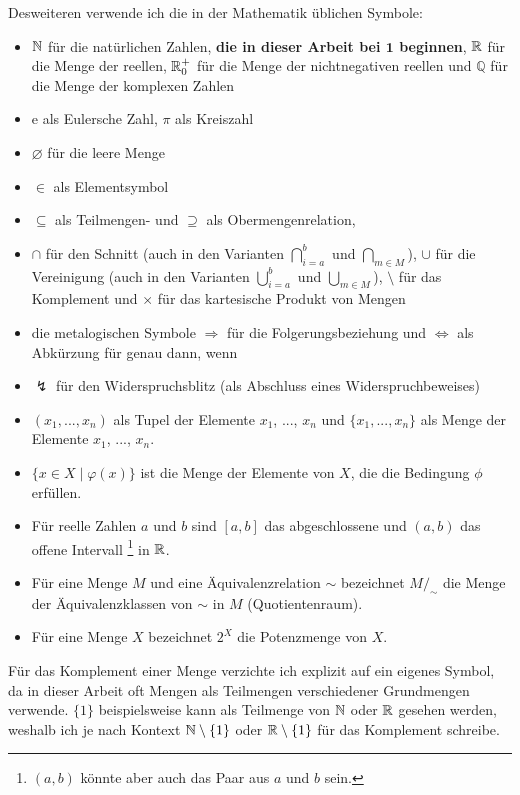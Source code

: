 Desweiteren verwende ich die in der Mathematik üblichen Symbole:
\begin{itemize}
    \item 
        $\mathbb{N}$ für die natürlichen Zahlen, \textbf{die in dieser Arbeit bei $\boldsymbol{1}$ beginnen}, $\mathbb{R}$ für die Menge der reellen, $\mathbb{R}_0^+$ für die Menge der nichtnegativen reellen und $\mathbb{Q}$ für die Menge der komplexen Zahlen
    \item 
        $\text{e}$ als Eulersche Zahl, $\pi$ als Kreiszahl
    \item 
        $\varnothing$ für die leere Menge
    \item
        $\in$ als Elementsymbol
    \item
        $\subseteq$ als Teilmengen- und $\supseteq$ als Obermengenrelation, 
    \item    
        $\cap$ für den Schnitt (auch in den Varianten $\bigcap_{i=a}^{b}$ und $\bigcap_{m \in M}$), $\cup$ für die Vereinigung (auch in den Varianten $\bigcup_{i=a}^{b}$ und $\bigcup_{m \in M}$), $\setminus$ für das Komplement und $\times$ für das kartesische Produkt von Mengen
    \item 
        die metalogischen Symbole $\Rightarrow$ für die Folgerungsbeziehung und $\Leftrightarrow$ als Abkürzung für \glqq genau dann, wenn\grqq
    \item 
        $\lightning$ für den Widerspruchsblitz (als Abschluss eines Widerspruchbeweises)
    \item
        $(x_1, ... , x_n)$ als Tupel der Elemente $x_1$, ..., $x_n$ und $\{x_1, ... , x_n\}$ als Menge der Elemente $x_1$, ..., $x_n$.
    \item
        $\{x \in X \mid \varphi(x)\}$ ist die Menge der Elemente von $X$, die die Bedingung $\phi$ erfüllen.
    \item
        Für reelle Zahlen $a$ und $b$ sind $[a,b]$ das abgeschlossene und $(a,b)$ das offene Intervall%
        \footnote{
            $(a,b)$ könnte aber auch das Paar aus $a$ und $b$ sein.
        }
        in $\mathbb{R}$.
    \item
        Für eine Menge $M$ und eine Äquivalenzrelation $\sim$ bezeichnet $M / _{\sim}$ die Menge der Äquivalenzklassen von $\sim$ in $M$ (Quotientenraum).
    \item
        Für eine Menge $X$ bezeichnet $2^X$ die Potenzmenge von $X$.
\end{itemize}

Für das Komplement einer Menge verzichte ich explizit auf ein eigenes Symbol, da in dieser Arbeit oft Mengen als Teilmengen verschiedener Grundmengen verwende. $\{1\}$ beispielsweise kann als Teilmenge von $\mathbb{N}$ oder $\mathbb{R}$ gesehen werden, weshalb ich je nach Kontext $\mathbb{N} \setminus \{1\}$ oder $\mathbb{R} \setminus \{1\}$ für das Komplement schreibe.
